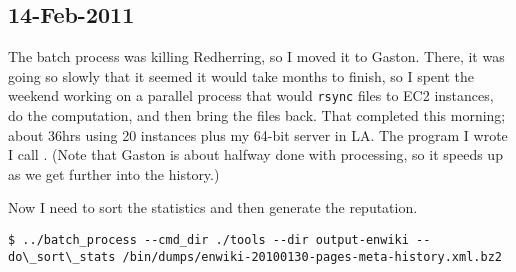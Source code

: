 \subsection{14-Feb-2011}

The batch process was killing Redherring, so I moved it to Gaston.
There, it was going so slowly that it seemed it would take months
to finish, so I spent the weekend working on a parallel process that
would \texttt{rsync} files to EC2 instances, do the computation,
and then bring the files back.
That completed this morning; about 36hrs using 20 instances plus
my 64-bit server in LA.
The program I wrote I call .
(Note that Gaston is about halfway done with processing, so
it speeds up as we get further into the history.)

Now I need to sort the statistics and then generate the reputation.
\begin{verbatim}
$ ../batch_process --cmd_dir ./tools --dir output-enwiki --do\_sort\_stats /bin/dumps/enwiki-20100130-pages-meta-history.xml.bz2
\end{verbatim}

